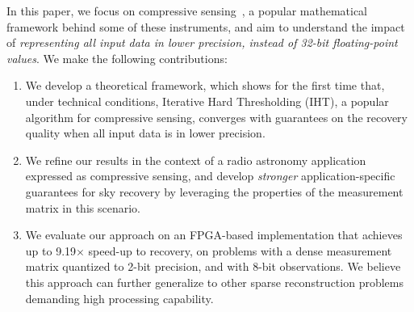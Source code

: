 \documentclass{article}
\begin{document}
In this paper, we focus on compressive sensing~\cite{donoho2006cs, candes2006cs, candes2006cs2}, a popular mathematical framework behind some of these instruments, and aim to understand 
the impact of {\em representing all input data
in lower precision, instead of 32-bit floating-point values}. 
We make the following contributions:

\begin{enumerate}
\item We develop a theoretical framework, which shows for the first time that, under
technical conditions, Iterative Hard Thresholding (IHT),
a popular algorithm for compressive sensing, converges
with guarantees on the recovery quality when all 
input data is in lower precision.

\item We refine our results in the context of a radio
astronomy application expressed as  compressive sensing, 
and develop {\em stronger} application-specific 
guarantees for sky recovery by leveraging the properties of the measurement matrix in this scenario.
 
\item We evaluate our approach on an FPGA-based
implementation that achieves up to 9.19$\times$ speed-up to recovery,  
on problems with a dense measurement matrix quantized to 2-bit precision, and with 8-bit observations.
We believe this approach can further generalize to other sparse reconstruction problems demanding high processing capability.
\end{enumerate}
\end{document}
